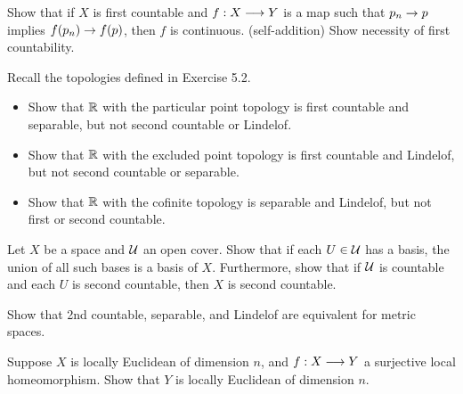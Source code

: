 \begin{exr}[source=Primary Source Material]
    Show that if $ X $ is first countable and $ f:X \longrightarrow Y $ is a map such that
    $ p_{n} \rightarrow p $ implies $ f(p_{n}) \rightarrow f(p) $, then $ f $ is continuous.
    (self-addition) Show necessity of first countability.
\end{exr}

\begin{exr}[source=Primary Source Material]
    Recall the topologies defined in Exercise 5.2.
    \begin{itemize}
        \item Show that $ \mathbb{R} $ with the particular point topology is first
            countable and separable, but not second countable or Lindelof.
        \item Show that $ \mathbb{R} $ with the excluded point topology is first
            countable and Lindelof, but not second countable or separable.
        \item Show that $ \mathbb{R} $ with the cofinite topology is separable and
            Lindelof, but not first or second countable.
    \end{itemize}
\end{exr}

\begin{exr}[source=Primary Source Material]
    Let $ X $ be a space and $ \mathcal{U} $ an open cover.
    Show that if each $ U \in \mathcal{U} $ has a basis, the union of all such bases
    is a basis of $ X $. Furthermore, show that if $ \mathcal{U} $ is countable and
    each $ U $ is second countable, then $ X $ is second countable.
\end{exr}

\begin{exr}[source=Primary Source Material]
    Show that 2nd countable, separable, and Lindelof are equivalent for
    metric spaces.
\end{exr}

\begin{exr}[source=Primary Source Material]
    Suppose $ X $ is locally Euclidean of dimension $ n $, and $ f:X \longrightarrow Y $
    a surjective local homeomorphism. Show that $ Y $ is locally Euclidean of
    dimension $ n $.
\end{exr}


